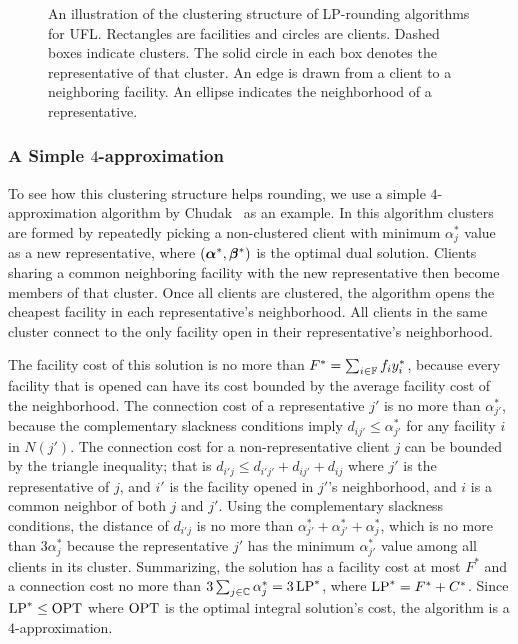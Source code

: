 \documentclass[oneside,final]{ucr}
\def\dsp{\def\baselinestretch{2.0}\large\normalsize}
\def\ssp{\def\baselinestretch{1.0}\large\normalsize}
\begin{document}
\begin{figure}[ht]
  \ssp
  \caption[Illustration of the clustering structure of
  LP-rounding algorithms for UFL.]{An illustration of the
    clustering structure of LP-rounding algorithms for
    UFL. Rectangles are facilities and circles are
    clients. Dashed boxes indicate clusters. The solid
    circle in each box denotes the representative of that
    cluster. An edge is drawn from a client to a neighboring
    facility. An ellipse indicates the neighborhood of a
    representative.}
  \label{fig:STA97}
\end{figure}
\dsp

\subsubsection{A Simple $4$-approximation}
To see how this clustering structure helps rounding, we use
a simple $4$-approximation algorithm by
Chudak~\cite{Chudak98} as an example. In this algorithm
clusters are formed by repeatedly picking a non-clustered
client with minimum $\alpha_j^\ast$ value as a new
representative, where $(\boldsymbol{\alpha}^\ast,\boldsymbol{\beta}^\ast)$ is the
optimal dual solution. Clients sharing a common neighboring
facility with the new representative then become members of
that cluster. Once all clients are clustered, the algorithm
opens the cheapest facility in each representative's
neighborhood. All clients in the same cluster connect to the
only facility open in their representative's neighborhood.

The facility cost of this solution is no more than $F^\ast =
\sum_{i\in\mathbb{F}} f_i y_i^\ast$, because every facility
that is opened can have its cost bounded by the average
facility cost of the neighborhood. The connection cost of a
representative $j'$ is no more than $\alpha_{j'}^\ast$,
because the complementary slackness conditions imply $d_{ij'}
\leq \alpha_{j'}^\ast$ for any facility $i$ in $N(j')$. The
connection cost for a non-representative client $j$ can be
bounded by the triangle inequality; that is $d_{i'j} \leq
d_{i'j'} + d_{ij'} + d_{ij}$ where $j'$ is the
representative of $j$, and $i'$ is the facility opened in
$j'$'s neighborhood, and $i$ is a common neighbor of both
$j$ and $j'$. Using the complementary slackness conditions,
the distance of $d_{i'j}$ is no more than $\alpha_{j'}^\ast
+ \alpha_{j'}^\ast + \alpha_j^\ast$, which is no more than
$3\alpha_j^\ast$ because the representative $j'$ has the
minimum $\alpha_{j'}^\ast$ value among all clients in its
cluster. Summarizing, the solution has a facility cost at
most $F^\ast$ and a connection cost no more than
$3\sum_{j\in\mathbb{C}} \alpha_j^\ast = 3\,\mbox{\rm LP}^\ast$, where
$\mbox{\rm LP}^\ast = F^\ast + C^\ast$. Since $\mbox{\rm LP}^\ast \leq \mbox{\rm OPT}$
where $\mbox{\rm OPT}$ is the optimal integral solution's cost, the
algorithm is a $4$-approximation.
\end{document}
